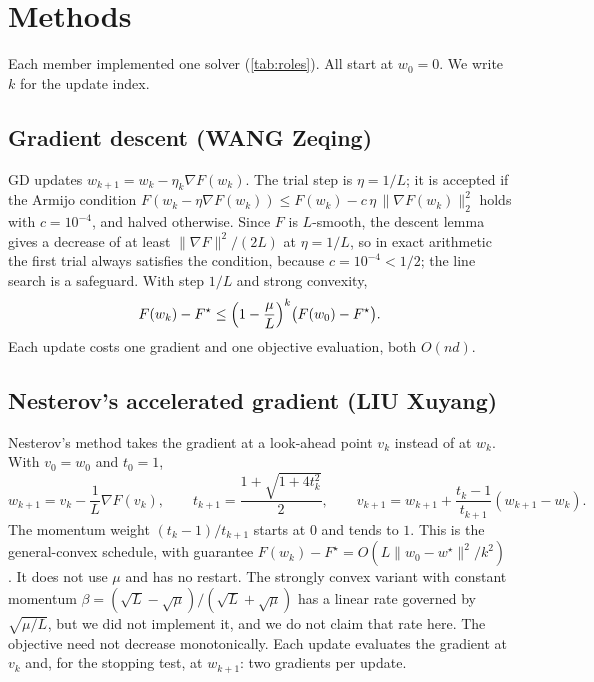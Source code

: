 \documentclass{article}
\begin{document}
\section{Methods}
\label{sec:methods}

Each member implemented one solver (\cref{tab:roles}). All start at $w_0=0$. We write $k$ for the update index.

\subsection{Gradient descent (WANG Zeqing)}
GD updates $w_{k+1}=w_k-\eta_k\nabla F(w_k)$. The trial step is $\eta=1/L$; it is accepted if the Armijo condition
$F(w_k-\eta\nabla F(w_k))\le F(w_k)-c\,\eta\,\|\nabla F(w_k)\|_2^2$ holds with $c=10^{-4}$, and halved otherwise. Since $F$ is $L$-smooth, the descent lemma gives a decrease of at least $\|\nabla F\|^2/(2L)$ at $\eta=1/L$, so in exact arithmetic the first trial always satisfies the condition, because $c=10^{-4}<1/2$; the line search is a safeguard. With step $1/L$ and strong convexity,
\begin{equation}
F(w_k)-F^\star\le\Bigl(1-\frac{\mu}{L}\Bigr)^k\bigl(F(w_0)-F^\star\bigr).
\end{equation}
Each update costs one gradient and one objective evaluation, both $O(nd)$.

\subsection{Nesterov's accelerated gradient (LIU Xuyang)}
Nesterov's method takes the gradient at a look-ahead point $v_k$ instead of at $w_k$. With $v_0=w_0$ and $t_0=1$,
\begin{equation}
\label{eq:nesterov}
w_{k+1}=v_k-\frac1L\nabla F(v_k),\qquad
t_{k+1}=\frac{1+\sqrt{1+4t_k^2}}{2},\qquad
v_{k+1}=w_{k+1}+\frac{t_k-1}{t_{k+1}}(w_{k+1}-w_k).
\end{equation}
The momentum weight $(t_k-1)/t_{k+1}$ starts at $0$ and tends to $1$. This is the general-convex schedule, with guarantee $F(w_k)-F^\star=O(L\|w_0-w^\star\|^2/k^2)$ \citep{nesterov1983method,beck2009fista}. It does not use $\mu$ and has no restart. The strongly convex variant with constant momentum $\beta=(\sqrt L-\sqrt\mu)/(\sqrt L+\sqrt\mu)$ has a linear rate governed by $\sqrt{\mu/L}$, but we did not implement it, and we do not claim that rate here. The objective need not decrease monotonically. Each update evaluates the gradient at $v_k$ and, for the stopping test, at $w_{k+1}$: two gradients per update.
\end{document}
